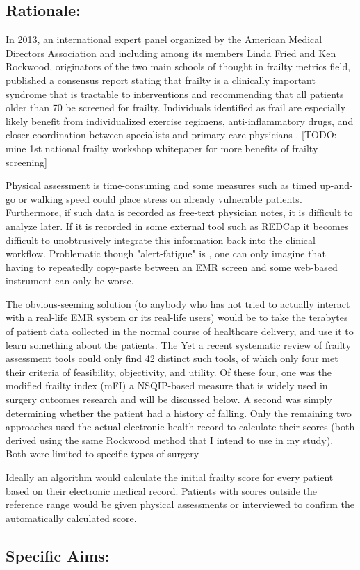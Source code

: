 \subsection{Rationale:}\label{rationale}
In 2013, an international expert panel organized by the American Medical Directors Association and including among its members Linda Fried and Ken Rockwood, originators of the two main schools of thought in frailty metrics field, published a consensus report \cite{Morley_2013} stating that frailty is a clinically important syndrome that is tractable to interventions and recommending that all patients older than 70 be screened for frailty. Individuals identified as frail are especially likely benefit from individualized exercise regimens, anti-inflammatory drugs, and closer coordination between specialists and primary care physicians \citep{16392724}. [TODO: mine 1st national frailty workshop whitepaper for more benefits of frailty screening]

Physical assessment is time-consuming and some measures such as timed up-and-go or walking speed \cite{10811152} could place stress on already vulnerable patients. Furthermore, if such data is recorded as free-text physician notes, it is difficult to analyze later. If it is recorded in some external tool such as REDCap \cite{Harris_2009} it becomes difficult to unobtrusively integrate this information back into the clinical workflow. Problematic though "alert-fatigue" is \cite{Kesselheim_2011}, one can only imagine that having to repeatedly copy-paste between an EMR screen and some web-based instrument can only be worse. 

The obvious-seeming solution (to anybody who has not tried to actually interact with a real-life EMR system or its real-life users) would be to take the terabytes of patient data collected in the normal course of healthcare delivery, and use it to learn something about the patients. The 
Yet a recent systematic review of frailty assessment tools \cite{McDonald_2016} could only find 42 distinct such tools, of which only four met their criteria of feasibility, objectivity, and utility. Of these four, one was the modified frailty index (mFI) \cite{Tsiouris_2013,22491599,23711971,Hodari_2013,Farhat_2012,23949353} a NSQIP-based measure that is widely used in surgery outcomes research and will be discussed below. A second was simply determining whether the patient had a history of falling. Only the remaining two approaches  used the actual electronic health record to calculate their scores (both derived using the same Rockwood \cite{Rockwood_2005} method that I intend to use in my study). Both were limited to specific types of surgery 

Ideally an algorithm would calculate the initial frailty score for every patient based on their electronic medical record. Patients with scores outside the reference range would be given physical assessments or interviewed to confirm the automatically calculated score.  

\subsection{Specific Aims:}\label{specific-aims}
